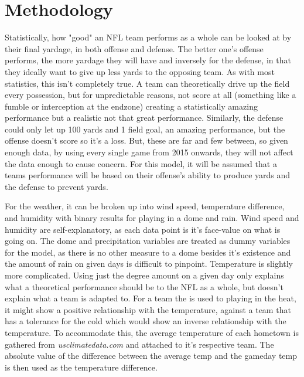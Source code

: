 \documentclass[12pt]{article}
\begin{document}
\section{Methodology}\label{method}
\quad Statistically, how "good" an NFL team performs as a whole can be looked at by their final yardage, in both offense and defense. The better one's offense performs, the more yardage they will have and inversely for the defense, in that they ideally want to give up less yards to the opposing team. As with most statistics, this isn't completely true. A team can theoretically drive up the field every possession, but for unpredictable reasons, not score at all (something like a fumble or interception at the endzone) creating a statistically amazing performance but a realistic not that great performance. Similarly, the defense could only let up 100 yards and 1 field goal, an amazing performance, but the offense doesn't score so it's a loss. But, these are far and few between, so given enough data, by using every single game from 2015 onwards, they will not affect the data enough to cause concern. For this model, it will be assumed that a teams performance will be based on their offense's ability to produce yards and the defense to prevent yards.

\quad For the weather, it can be broken up into wind speed, temperature difference, and humidity with binary results for playing in a dome and rain. Wind speed and humidity are self-explanatory, as each data point is it's face-value on what is going on. The dome and precipitation variables are treated as dummy variables for the model, as there is no other measure to a dome besides it's existence and the amount of rain on given days is difficult to pinpoint. Temperature is slightly more complicated. Using just the degree amount on a given day only explains what a theoretical performance should be to the NFL as a whole, but doesn't explain what a team is adapted to. For a team the is used to playing in the heat, it might show a positive relationship with the temperature, against a team that has a tolerance for the cold which would show an inverse relationship with the temperature. To accommodate this, the average temperature of each hometown is gathered from \textit{usclimatedata.com} and attached to it's respective team. The absolute value of the difference between the average temp and the gameday temp is then used as the temperature difference.
\end{document}
